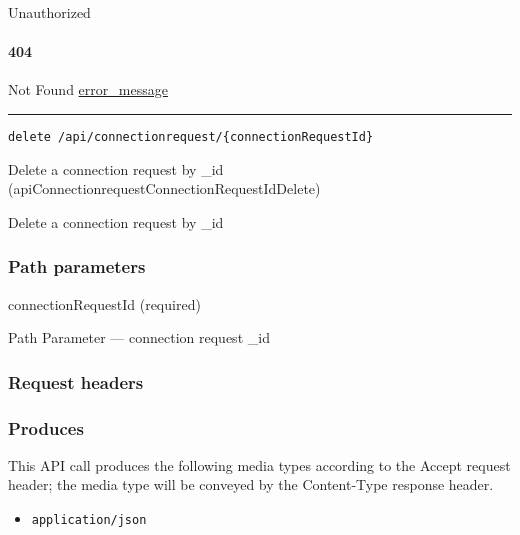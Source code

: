 Unauthorized \protect\hyperlink{}{}

\hypertarget{section-5}{%
\paragraph{404}\label{section-5}}

Not Found \protect\hyperlink{error_message}{error\_message}

\begin{center}\rule{0.5\linewidth}{\linethickness}\end{center}

\protect\hypertarget{apiConnectionrequestConnectionRequestIdDelete}{}{}

\begin{verbatim}
delete /api/connectionrequest/{connectionRequestId}
\end{verbatim}

Delete a connection request by \_id
({apiConnectionrequestConnectionRequestIdDelete})

Delete a connection request by \_id

\hypertarget{path-parameters-2}{%
\subsubsection{Path parameters}\label{path-parameters-2}}

connectionRequestId (required)

{Path Parameter} --- connection request \_id

\hypertarget{request-headers-2}{%
\subsubsection{Request headers}\label{request-headers-2}}

\hypertarget{produces-2}{%
\subsubsection{Produces}\label{produces-2}}

This API call produces the following media types according to the
{Accept} request header; the media type will be conveyed by the
{Content-Type} response header.

\begin{itemize}
\tightlist
\item
  \texttt{application/json}
\end{itemize}

